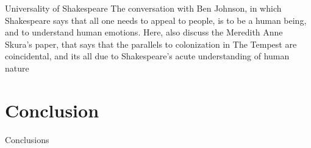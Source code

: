 \documentclass{beamer}
\begin{document}
  \begin{frame}{Universality of Shakespeare}
    The conversation with Ben Johnson, in which Shakespeare says that all one needs to appeal to people, is to be a human being, and to understand human emotions.
    Here, also discuss the Meredith Anne Skura's paper, that says that the parallels to colonization in The Tempest are coincidental, and its all due to Shakespeare's acute understanding of human nature
  \end{frame}

  \section{Conclusion}
  \begin{frame}{Conclusions}
    \end{frame}
\end{document}
